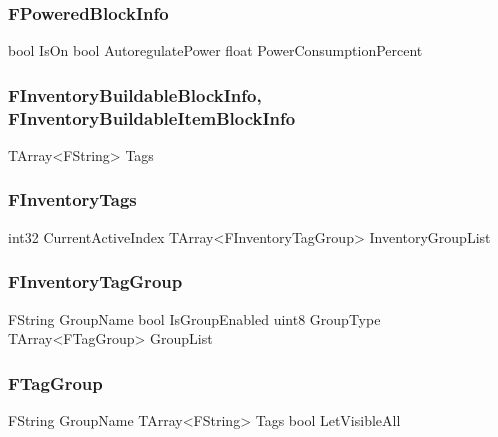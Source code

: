 \subsubsection{FPoweredBlockInfo}
\begin{code}
bool                                        IsOn
bool                                        AutoregulatePower
float                                       PowerConsumptionPercent
\end{code}



\subsubsection{FInventoryBuildableBlockInfo, FInventoryBuildableItemBlockInfo}
\begin{code}
TArray<FString>                             Tags
\end{code}

\newpage


\subsubsection{FInventoryTags}
\begin{code}
int32                                       CurrentActiveIndex
TArray<FInventoryTagGroup>                  InventoryGroupList
\end{code}

\subsubsection{FInventoryTagGroup}
\begin{code}
FString                                     GroupName
bool                                        IsGroupEnabled
uint8                                       GroupType
TArray<FTagGroup>                           GroupList
\end{code}

\subsubsection{FTagGroup}
\begin{code}
FString                                     GroupName
TArray<FString>                             Tags
bool                                        LetVisibleAll
\end{code}

